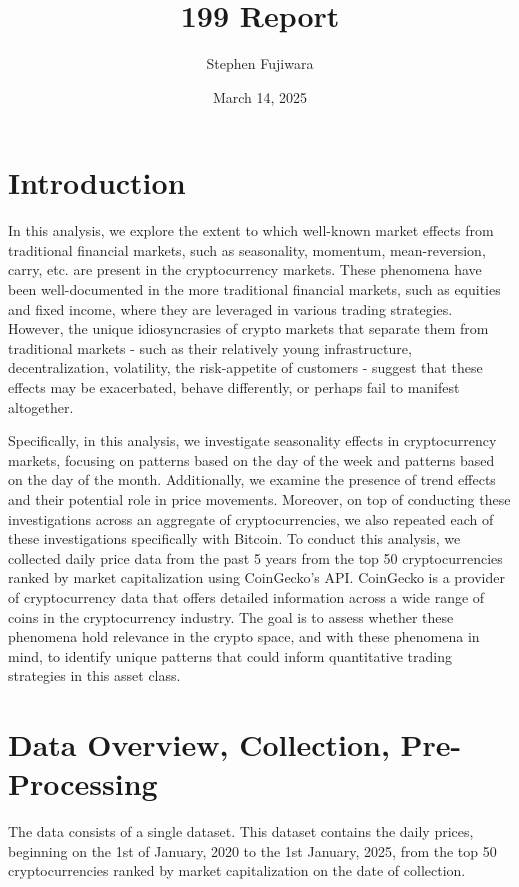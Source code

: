 \documentclass[
]{article}
\title{199 Report}
\author{Stephen Fujiwara}
\date{March 14, 2025}
\begin{document}
\maketitle

\section{Introduction}\label{introduction}

In this analysis, we explore the extent to which well-known market
effects from traditional financial markets, such as seasonality,
momentum, mean-reversion, carry, etc. are present in the cryptocurrency
markets. These phenomena have been well-documented in the more
traditional financial markets, such as equities and fixed income, where
they are leveraged in various trading strategies. However, the unique
idiosyncrasies of crypto markets that separate them from traditional
markets - such as their relatively young infrastructure,
decentralization, volatility, the risk-appetite of customers - suggest
that these effects may be exacerbated, behave differently, or perhaps
fail to manifest altogether.

Specifically, in this analysis, we investigate seasonality effects in
cryptocurrency markets, focusing on patterns based on the day of the
week and patterns based on the day of the month. Additionally, we
examine the presence of trend effects and their potential role in price
movements. Moreover, on top of conducting these investigations across an
aggregate of cryptocurrencies, we also repeated each of these
investigations specifically with Bitcoin. To conduct this analysis, we
collected daily price data from the past 5 years from the top 50
cryptocurrencies ranked by market capitalization using CoinGecko's API.
CoinGecko is a provider of cryptocurrency data that offers detailed
information across a wide range of coins in the cryptocurrency industry.
The goal is to assess whether these phenomena hold relevance in the
crypto space, and with these phenomena in mind, to identify unique
patterns that could inform quantitative trading strategies in this asset
class.

\section{Data Overview, Collection,
Pre-Processing}\label{data-overview-collection-pre-processing}

The data consists of a single dataset. This dataset contains the daily
prices, beginning on the 1st of January, 2020 to the 1st January, 2025,
from the top 50 cryptocurrencies ranked by market capitalization on the
date of collection.
\end{document}
